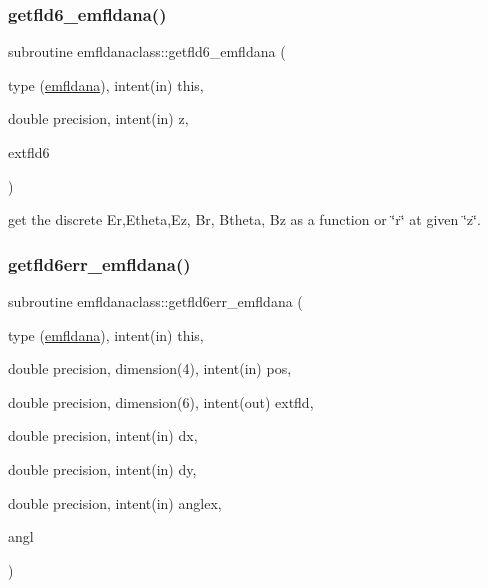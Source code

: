 \subsubsection{\texorpdfstring{getfld6\_emfldana()}{getfld6\_emfldana()}}
{\footnotesize\ttfamily subroutine emfldanaclass\+::getfld6\+\_\+emfldana (\begin{DoxyParamCaption}\item[{type (\mbox{\hyperlink{namespaceemfldanaclass_structemfldanaclass_1_1emfldana}{emfldana}}), intent(in)}]{this,  }\item[{double precision, intent(in)}]{z,  }\item[{}]{extfld6 }\end{DoxyParamCaption})}



get the discrete Er,Etheta,Ez, Br, Btheta, Bz as a function or \char`\"{}r\char`\"{} at given \char`\"{}z\char`\"{}. 

\mbox{\label{namespaceemfldanaclass_af8390aa825a9ca8733745551ee96bc17}} 
\subsubsection{\texorpdfstring{getfld6err\_emfldana()}{getfld6err\_emfldana()}}
{\footnotesize\ttfamily subroutine emfldanaclass\+::getfld6err\+\_\+emfldana (\begin{DoxyParamCaption}\item[{type (\mbox{\hyperlink{namespaceemfldanaclass_structemfldanaclass_1_1emfldana}{emfldana}}), intent(in)}]{this,  }\item[{double precision, dimension(4), intent(in)}]{pos,  }\item[{double precision, dimension(6), intent(out)}]{extfld,  }\item[{double precision, intent(in)}]{dx,  }\item[{double precision, intent(in)}]{dy,  }\item[{double precision, intent(in)}]{anglex,  }\item[{}]{angl }\end{DoxyParamCaption})}

\mbox{\label{namespaceemfldanaclass_a8cc6ab7d703889424d80d660ca470042}} 
